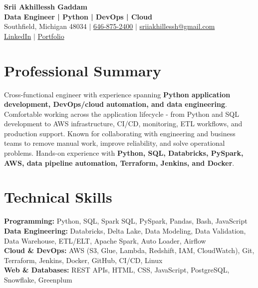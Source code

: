 \documentclass[letterpaper,10pt]{article}
\begin{document}
\fontsize{9.35pt}{10.45pt}\selectfont

\begin{center}
    {\LARGE \textbf{Srii Akhillessh Gaddam}} \\[-1pt]
    \textbf{Data Engineer | Python | DevOps | Cloud} \\[2pt]
    Southfield, Michigan 48034 $|$
    \href{tel:6468752400}{646-875-2400} $|$
    \href{mailto:sriiakhillessh@gmail.com}{sriiakhillessh@gmail.com} \\[1pt]
    \href{https://www.linkedin.com/in/srii-akhiilessh-gaddam-b48668191/}{LinkedIn} $|$
    \href{https://sriiakhillesshg.github.io/portfolio/}{Portfolio}
\end{center}
\vspace{-8pt}

\section{Professional Summary}
\small{Cross-functional engineer with experience spanning \textbf{Python application development, DevOps/cloud automation, and data engineering}. Comfortable working across the application lifecycle - from Python and SQL development to AWS infrastructure, CI/CD, monitoring, ETL workflows, and production support. Known for collaborating with engineering and business teams to remove manual work, improve reliability, and solve operational problems. Hands-on experience with \textbf{Python, SQL, Databricks, PySpark, AWS, data pipeline automation, Terraform, Jenkins, and Docker}.}

\section{Technical Skills}
\small{
\textbf{Programming:} Python, SQL, Spark SQL, PySpark, Pandas, Bash, JavaScript \\
\textbf{Data Engineering:} Databricks, Delta Lake, Data Modeling, Data Validation, Data Warehouse, ETL/ELT, Apache Spark, Auto Loader, Airflow \\
\textbf{Cloud \& DevOps:} AWS (S3, Glue, Lambda, Redshift, IAM, CloudWatch), Git, Terraform, Jenkins, Docker, GitHub, CI/CD, Linux \\
\textbf{Web \& Databases:} REST APIs, HTML, CSS, JavaScript, PostgreSQL, Snowflake, Greenplum
}
\end{document}
